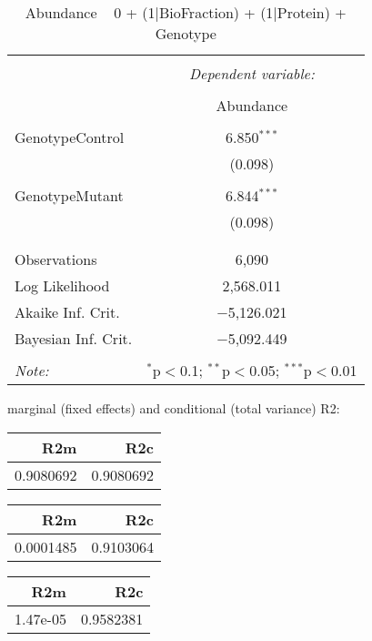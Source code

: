 \documentclass[11pt]{report}
\begin{document}
\begin{table}[!htbp] \centering 
  \caption{Abundance ~ 0 + (1|BioFraction) + (1|Protein) + Genotype} 
  \label{} 
\begin{tabular}{@{\extracolsep{5pt}}lc} 
\\[-1.8ex]\hline 
\hline \\[-1.8ex] 
 & \multicolumn{1}{c}{\textit{Dependent variable:}} \\ 
\cline{2-2} 
\\[-1.8ex] & Abundance \\ 
\hline \\[-1.8ex] 
 GenotypeControl & 6.850$^{***}$ \\ 
  & (0.098) \\ 
  & \\ 
 GenotypeMutant & 6.844$^{***}$ \\ 
  & (0.098) \\ 
  & \\ 
\hline \\[-1.8ex] 
Observations & 6,090 \\ 
Log Likelihood & 2,568.011 \\ 
Akaike Inf. Crit. & $-$5,126.021 \\ 
Bayesian Inf. Crit. & $-$5,092.449 \\ 
\hline 
\hline \\[-1.8ex] 
\textit{Note:}  & \multicolumn{1}{r}{$^{*}$p$<$0.1; $^{**}$p$<$0.05; $^{***}$p$<$0.01} \\ 
\end{tabular} 
\end{table} 
marginal (fixed effects) and conditional (total variance) R2:

\begin{tabular}{r|r}
\hline
R2m & R2c\\
\hline
0.9080692 & 0.9080692\\
\hline
\end{tabular}

\begin{tabular}{r|r}
\hline
R2m & R2c\\
\hline
0.0001485 & 0.9103064\\
\hline
\end{tabular}

\begin{tabular}{r|r}
\hline
R2m & R2c\\
\hline
1.47e-05 & 0.9582381\\
\hline
\end{tabular}
\end{document}
